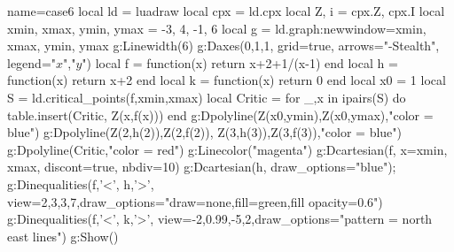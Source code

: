 \documentclass[border=2 mm]{standalone}
\begin{document}
\begin{luadraw}{name=case6}
local ld = luadraw
local cpx = ld.cpx
local Z, i = cpx.Z, cpx.I
local xmin, xmax, ymin, ymax = -3, 4, -1, 6
local g = ld.graph:new{window={xmin, xmax, ymin, ymax}}  
g:Linewidth(6)
g:Daxes({0,1,1}, {grid=true, arrows="-Stealth", legend={"$x$","$y$"}})
local f = function(x) return x+2+1/(x-1)  end
local h = function(x) return x+2 end
local k = function(x) return 0 end
local x0 = 1   
local S = ld.critical_points(f,xmin,xmax)
local Critic = {}
for _,x in ipairs(S) do
    table.insert(Critic, Z(x,f(x)))
end
g:Dpolyline({{Z(x0,ymin),Z(x0,ymax)}},"color = blue")
g:Dpolyline({{Z(2,h(2)),Z(2,f(2))}, {Z(3,h(3)),Z(3,f(3))}},"color = blue")
g:Dpolyline(Critic,"color = red")
g:Linecolor("magenta")
g:Dcartesian(f, {x={xmin, xmax}, discont=true,  nbdiv=10})
g:Dcartesian(h, {draw_options="blue"}); 
g:Dinequalities({f,'<', h,'>'}, {view={2,3,3,7},draw_options="draw=none,fill=green,fill opacity=0.6"})
g:Dinequalities({f,'<', k,'>'}, {view={-2,0.99,-5,2},draw_options="pattern = north east lines"})
g:Show()
\end{luadraw}
\end{document}
